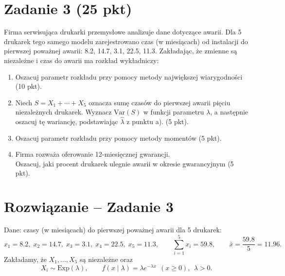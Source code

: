 \documentclass[polish, 10pt]{extarticle}
\begin{document}
\section*{Zadanie 3 (25 pkt)}
Firma serwisująca drukarki przemysłowe analizuje dane dotyczące awarii. Dla 5 drukarek tego samego modelu zarejestrowano czas (w miesiącach) od instalacji do pierwszej poważnej awarii: 8.2, 14.7, 3.1, 22.5, 11.3.
Zakładając, że zmienne są niezależne i czas do awarii ma rozkład wykładniczy:
\begin{enumerate}
    \item[a)] Oszacuj parametr rozkładu przy pomocy metody największej wiarygodności \hfill (10 pkt).
    \item[b)] Niech $S=X_1+\cdots+X_5$ oznacza sumę czasów do pierwszej awarii pięciu niezależnych drukarek. Wyznacz $\mathrm{Var}(S)$ w funkcji parametru $\lambda$, a następnie oszacuj tę wariancję, podstawiając $\hat{\lambda}$ z punktu a). \hfill (5 pkt).
    \item[c)] Oszacuj parametr rozkładu przy pomocy metody momentów \hfill (5 pkt).
    \item[d)] Firma rozważa oferowanie 12-miesięcznej gwarancji. \\Oszacuj, jaki procent drukarek ulegnie awarii w okresie gwarancyjnym \hfill (5 pkt).
\end{enumerate}

\section*{Rozwiązanie -- Zadanie 3}

Dane: czasy (w miesiącach) do pierwszej poważnej awarii dla 5 drukarek:
\[
x_1=8.2,\; x_2=14.7,\; x_3=3.1,\; x_4=22.5,\; x_5=11.3,
\qquad \sum_{i=1}^5 x_i = 59.8,\qquad \bar x=\frac{59.8}{5}=11.96.
\]
Zakładamy, że $X_1,\dots,X_5$ są niezależne oraz
\[
X_i \sim \mathrm{Exp}(\lambda), \qquad f(x\mid \lambda)=\lambda e^{-\lambda x}\ \ (x\ge 0),\ \ \lambda>0.
\]
\end{document}
